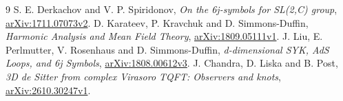 \documentclass[11pt,a4paper]{article}
\begin{document}
\begin{thebibliography}{9}
 S. E. Derkachov and V. P. Spiridonov,
\emph{On the 6j-symbols for SL(2,C) group},
\href{https://arxiv.org/html/1711.07073v2}{arXiv:1711.07073v2}.
 D. Karateev, P. Kravchuk and D. Simmons-Duffin,
\emph{Harmonic Analysis and Mean Field Theory},
\href{https://arxiv.org/html/1809.05111v1}{arXiv:1809.05111v1}.
 J. Liu, E. Perlmutter, V. Rosenhaus and D. Simmons-Duffin,
\emph{d-dimensional SYK, AdS Loops, and 6j Symbols},
\href{https://arxiv.org/html/1808.00612v3}{arXiv:1808.00612v3}.
 J. Chandra, D. Liska and B. Post,
\emph{3D de Sitter from complex Virasoro TQFT: Observers and knots},
\href{https://arxiv.org/html/2610.30247v1}{arXiv:2610.30247v1}.
\end{thebibliography}
\end{document}
